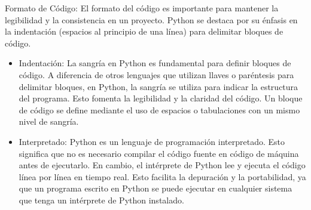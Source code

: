 Formato de Código: El formato del código es importante para mantener la legibilidad y la consistencia en un proyecto. Python se destaca por su énfasis en la indentación (espacios al principio de una línea) para delimitar bloques de código. 
\begin{itemize}
    \item Indentación: La sangría en Python es fundamental para definir bloques de código. A diferencia de otros lenguajes que utilizan llaves o paréntesis para delimitar bloques, en Python, la sangría se utiliza para indicar la estructura del programa. Esto fomenta la legibilidad y la claridad del código. Un bloque de código se define mediante el uso de espacios o tabulaciones con un mismo nivel de sangría. 
\begin{figure}[h]
    \centering
    \end{figure}
    \item Interpretado: Python es un lenguaje de programación interpretado. Esto significa que no es necesario compilar el código fuente en código de máquina antes de ejecutarlo. En cambio, el intérprete de Python lee y ejecuta el código línea por línea en tiempo real. Esto facilita la depuración y la portabilidad, ya que un programa escrito en Python se puede ejecutar en cualquier sistema que tenga un intérprete de Python instalado.
\begin{figure}[h]
    \centering
\end{figure}
\end{itemize}
